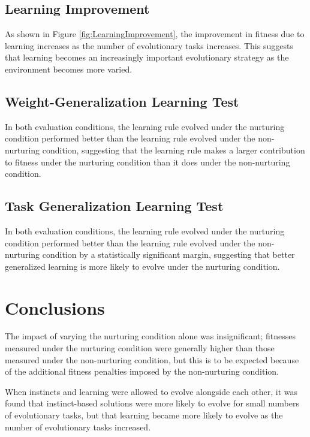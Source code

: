 \documentclass[master]{outhesis}
\begin{document}
\section{Learning Improvement}

As shown in Figure \ref{fig:LearningImprovement},
the improvement in fitness due to learning increases as the number of evolutionary tasks increases.
This suggests that learning becomes an increasingly important evolutionary strategy as the environment becomes more varied.

\section{Weight-Generalization Learning Test}

In both evaluation conditions,
the learning rule evolved under the nurturing condition performed better than the learning rule evolved under the non-nurturing condition,
suggesting that the learning rule makes a larger contribution to fitness under the nurturing condition than it does under the non-nurturing condition.

\section{Task Generalization Learning Test}

In both evaluation conditions,
the learning rule evolved under the nurturing condition performed better than the learning rule evolved under the non-nurturing condition by a statistically significant margin,
suggesting that better generalized learning is more likely to evolve under the nurturing condition.

\chapter{Conclusions}

The impact of varying the nurturing condition alone was insignificant; 
fitnesses measured under the nurturing condition were generally higher than those measured under the non-nurturing condition, 
but this is to be expected because of the additional fitness penalties imposed by the non-nurturing condition.

When instincts and learning were allowed to evolve alongside each other, 
it was found that instinct-based solutions were more likely to evolve for small numbers of evolutionary tasks, 
but that learning became more likely to evolve as the number of evolutionary tasks increased.
\end{document}
